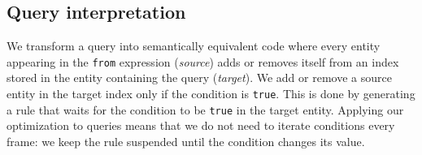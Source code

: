 \subsection{Query interpretation}


We transform a query into semantically equivalent code where every entity appearing in the \texttt{from} expression (\textit{source}) adds or removes itself from an index stored in the entity containing the query (\textit{target}). We add or remove a source entity in the target index only if the condition is \texttt{true}. This is done by generating a rule that waits for the condition to be \texttt{true} in the target entity. Applying our optimization to queries means that we do not need to iterate conditions every frame: we keep the rule suspended until the condition changes its value.

